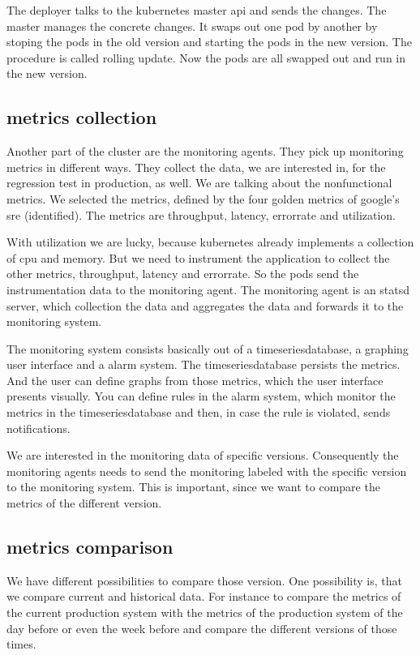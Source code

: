 The deployer talks to the kubernetes master api and sends the changes. The master manages
the concrete changes. It swaps out one pod by another by stoping the pods in the old
version and starting the pods in the new version. The procedure is called rolling
update. Now the pods are all swapped out and run in the new version.

\subsection{metrics collection}
Another part of the cluster are the monitoring agents. They pick up monitoring metrics in
different ways. They collect the data, we are interested in, for the regression test in
production, as well. We are talking about the nonfunctional metrics. We selected the
metrics, defined by the four golden metrics of google's sre (identified). The metrics are
throughput, latency, errorrate and utilization.

With utilization we are lucky, because kubernetes already implements a collection of cpu
and memory. But we need to instrument the application to collect the other metrics,
throughput, latency and errorrate. So the pods send the instrumentation data to the
monitoring agent. The monitoring agent is an statsd server, which collection the data and
aggregates the data and forwards it to the monitoring system.

The monitoring system consists basically out of a timeseriesdatabase, a graphing user
interface and a alarm system. The timeseriesdatabase persists the metrics. And the user
can define graphs from those metrics, which the user interface presents visually. You can
define rules in the alarm system, which monitor the metrics in the timeseriesdatabase and
then, in case the rule is violated, sends notifications.

We are interested in the monitoring data of specific versions. Consequently the monitoring
agents needs to send the monitoring labeled with the specific version to the monitoring
system. This is important, since we want to compare the metrics of the different version.

\subsection{metrics comparison}

We have different possibilities to compare those version. One possibility is, that we
compare current and historical data. For instance to compare the metrics of the current
production system with the metrics of the production system of the day before or even the
week before and compare the different versions of those times.


